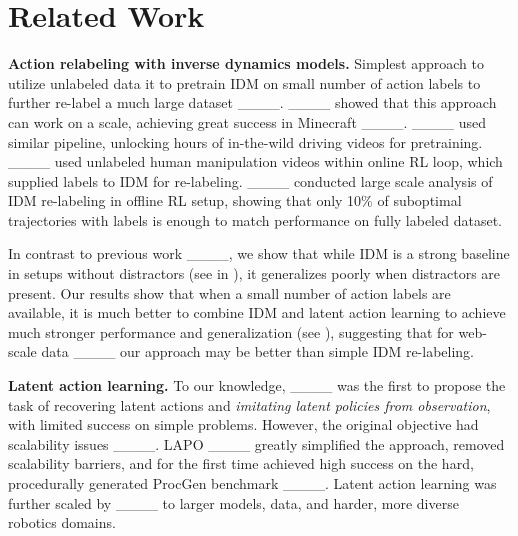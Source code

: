 \section{Related Work}
\textbf{Action relabeling with inverse dynamics models.} Simplest approach to utilize unlabeled data it to pretrain IDM on small number of action labels to further re-label a much large dataset ____. ____ showed that this approach can work on a scale, achieving great success in Minecraft ____. ____ used similar pipeline, unlocking hours of in-the-wild driving videos for pretraining. ____ used unlabeled human manipulation videos within online RL loop, which supplied labels to IDM for re-labeling. ____ conducted large scale analysis of IDM re-labeling in offline RL setup, showing that only 10\% of suboptimal trajectories with labels is enough to match performance on fully labeled dataset.

In contrast to previous work ____, we show that while IDM is a strong baseline in setups without distractors (see  in ), it generalizes poorly when distractors are present. Our results show that when a small number of action labels are available, it is much better to combine IDM and latent action learning to achieve much stronger performance and generalization (see ), suggesting that for web-scale data ____ our approach may be better than simple IDM re-labeling. 

\textbf{Latent action learning.} To our knowledge, ____ was the first to propose the task of recovering latent actions and \emph{imitating latent policies from observation}, with limited success on simple problems. However, the original objective had scalability issues ____. LAPO ____ greatly simplified the approach, removed scalability barriers, and for the first time achieved high success on the hard, procedurally generated ProcGen benchmark ____. Latent action learning was further scaled by ____ to larger models, data, and harder, more diverse robotics domains. 

